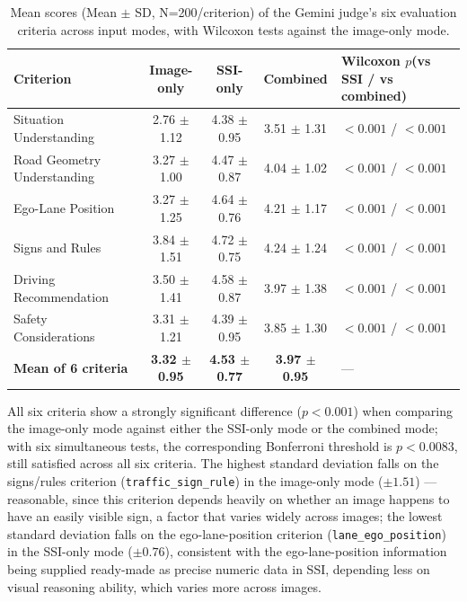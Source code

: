 \documentclass[12pt,a4paper]{report}
\begin{document}
\begin{table}[htbp]
    \centering
    \footnotesize
    \caption[Mean scores of the Gemini judge's six evaluation criteria across input modes]{Mean scores (Mean $\pm$ SD, N=200/criterion) of the Gemini judge's six evaluation criteria across input modes, with Wilcoxon tests against the image-only mode.}
    \label{tab:4.7}
    \begin{tabular}{@{}p{3.2cm}ccc p{2.6cm}@{}}
        \toprule
        \textbf{Criterion} & \textbf{Image-only} & \textbf{SSI-only} & \textbf{Combined} & \textbf{Wilcoxon $p$}\newline(vs SSI / vs combined) \\
        \midrule
        Situation Understanding  & 2.76 $\pm$ 1.12 & 4.38 $\pm$ 0.95 & 3.51 $\pm$ 1.31 & $<0.001$ / $<0.001$ \\
        Road Geometry Understanding       & 3.27 $\pm$ 1.00 & 4.47 $\pm$ 0.87 & 4.04 $\pm$ 1.02 & $<0.001$ / $<0.001$ \\
        Ego-Lane Position       & 3.27 $\pm$ 1.25 & 4.64 $\pm$ 0.76 & 4.21 $\pm$ 1.17 & $<0.001$ / $<0.001$ \\
        Signs and Rules       & 3.84 $\pm$ 1.51 & 4.72 $\pm$ 0.75 & 4.24 $\pm$ 1.24 & $<0.001$ / $<0.001$ \\
        Driving Recommendation   & 3.50 $\pm$ 1.41 & 4.58 $\pm$ 0.87 & 3.97 $\pm$ 1.38 & $<0.001$ / $<0.001$ \\
        Safety Considerations    & 3.31 $\pm$ 1.21 & 4.39 $\pm$ 0.95 & 3.85 $\pm$ 1.30 & $<0.001$ / $<0.001$ \\
        \textbf{Mean of 6 criteria} & \textbf{3.32 $\pm$ 0.95} & \textbf{4.53 $\pm$ 0.77} & \textbf{3.97 $\pm$ 0.95} & --- \\
        \bottomrule
    \end{tabular}
\end{table}

All six criteria show a strongly significant difference ($p<0.001$) when comparing the image-only mode against either the SSI-only mode or the combined mode; with six simultaneous tests, the corresponding Bonferroni threshold is $p < 0.0083$, still satisfied across all six criteria. The highest standard deviation falls on the signs/rules criterion (\texttt{traffic\_sign\_rule}) in the image-only mode ($\pm 1.51$) --- reasonable, since this criterion depends heavily on whether an image happens to have an easily visible sign, a factor that varies widely across images; the lowest standard deviation falls on the ego-lane-position criterion (\texttt{lane\_ego\_position}) in the SSI-only mode ($\pm 0.76$), consistent with the ego-lane-position information being supplied ready-made as precise numeric data in SSI, depending less on visual reasoning ability, which varies more across images.
\end{document}

